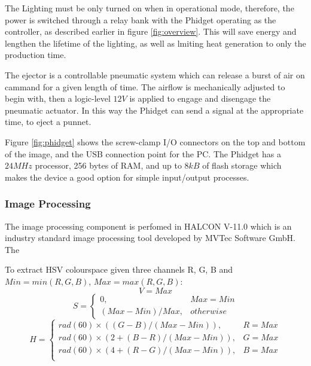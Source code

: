 \documentclass[fleqn,twoside]{article}
\begin{document}
The Lighting must be only turned on when in operational mode, therefore, the power is switched through a relay bank with the Phidget operating as the controller, as described earlier in figure \ref{fig:overview}. This will save energy and lengthen the lifetime of the lighting, as well as lmiting heat generation to only the production time.

The ejector is a controllable pneumatic system which can release a burst of air on cammand for a given length of time. The airflow is mechanically adjusted to begin with, then a logic-level $12V$ is applied to engage and disengage the pneumatic actuator. In this way the Phidget can send a signal at the appropriate time, to eject a punnet.


Figure \ref{fig:phidget} shows the screw-clamp I/O connectors on the top and bottom of the image, and the USB connection point for the PC. The Phidget has a $24MHz$ processor, 256 bytes of RAM, and up to $8kB$ of flash storage which makes the device a good option for simple input/output processes.


\subsubsection{Image Processing}

The image processing component is perfomed in \texttrademark HALCON V-11.0 which is an industry standard image processing tool developed by MVTec Software GmbH. The 

To extract HSV colourspace given three channels R, G, B and $Min = min(R, G, B)$, $Max = max(R, G, B)$:
\begin{equation}
	V = Max
\end{equation}
\begin{equation}
	S = 
	\begin{cases} 
		0, & Max=Min \\   
		(Max-Min)/Max, & otherwise        
	\end{cases}
\end{equation}
\begin{equation}
H = 
\begin{cases} 
rad(60) \times ((G-B)/(Max-Min)), & R=Max \\
rad(60) \times (2 + (B-R)/(Max-Min)), & G=Max \\
rad(60) \times (4 + (R-G)/(Max-Min)), & B=Max \\   
\end{cases}
\end{equation}
\end{document}
